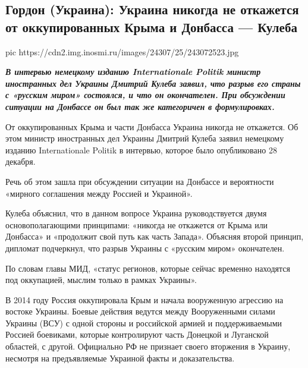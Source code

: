  
 
 
 
 
 
\subsection{Гордон (Украина): Украина никогда не откажется от оккупированных Крыма и Донбасса — Кулеба}
\label{sec:28_12_2020.news.ru.inosmi.1.ukraina_ruskii_mir}


\ifcmt
  pic https://cdn2.img.inosmi.ru/images/24307/25/243072523.jpg
\fi

\begin{leftbar}
  \begingroup
    \em\Large\bfseries\color{blue}
В интервью немецкому изданию Internationale Politik министр иностранных дел
Украины Дмитрий Кулеба заявил, что разрыв его страны с «русским миром»
состоялся, и что он окончателен. При обсуждении ситуации на Донбассе он был так
же категоричен в формулировках.
  \endgroup
\end{leftbar}

От оккупированных Крыма и части Донбасса Украина никогда не откажется. Об этом
министр иностранных дел Украины Дмитрий Кулеба заявил немецкому изданию
Internationale Politik в интервью, которое было опубликовано 28 декабря.

Речь об этом зашла при обсуждении ситуации на Донбассе и вероятности «мирного
соглашения между Россией и Украиной».

Кулеба объяснил, что в данном вопросе Украина руководствуется двумя
основополагающими принципами: «никогда не откажется от Крыма или Донбасса» и
«продолжит свой путь как часть Запада». Объясняя второй принцип, дипломат
подчеркнул, что разрыв Украины с «русским миром» окончателен.

По словам главы МИД, «статус регионов, которые сейчас временно находятся под
оккупацией, мыслим только в рамках Украины».

В 2014 году Россия оккупировала Крым и начала вооруженную агрессию на востоке
Украины. Боевые действия ведутся между Вооруженными силами Украины (ВСУ) с
одной стороны и российской армией и поддерживаемыми Россией боевиками, которые
контролируют часть Донецкой и Луганской областей, с другой. Официально РФ не
признает своего вторжения в Украину, несмотря на предъявляемые Украиной факты и
доказательства.

